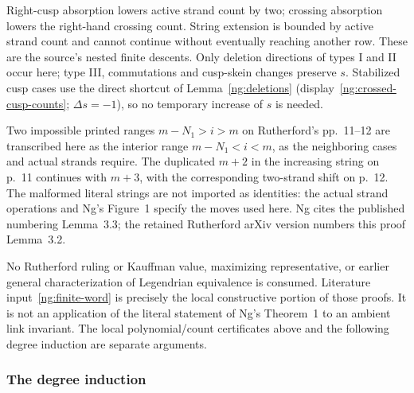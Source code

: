Right-cusp absorption lowers active strand count by two; crossing
absorption lowers the right-hand crossing count. String extension is
bounded by active strand count and cannot continue without eventually
reaching another row. These are the source's nested finite descents.
Only deletion directions of types I and II occur here; type III,
commutations and cusp-skein changes preserve $s$. Stabilized cusp cases
use the direct shortcut of Lemma~\ref{ng:deletions}
(display~\eqref{ng:crossed-cusp-counts}; $\Delta s=-1$), so no temporary
increase of $s$ is needed.

Two impossible printed ranges $m-N_1>i>m$ on Rutherford's pp.~11--12
are transcribed here as the interior range $m-N_1<i<m$, as the
neighboring cases and actual strands require. The duplicated $m+2$
in the increasing string on p.~11 continues with $m+3$, with the
corresponding two-strand shift on p.~12. The malformed literal strings
are not imported as identities: the actual strand operations and Ng's
Figure~1 specify the moves used here. Ng cites the published numbering
Lemma~3.3; the retained Rutherford arXiv version numbers this proof
Lemma~3.2.

No Rutherford ruling or Kauffman value, maximizing representative, or
earlier general characterization of Legendrian equivalence is consumed.
Literature input~\ref{ng:finite-word} is precisely the local constructive
portion of those proofs. It is not an application of the literal
statement of Ng's Theorem~1 to an ambient link invariant. The local
polynomial/count certificates above and the following degree induction
are separate arguments.

\subsubsection{The degree induction}
\label{ng:induction-section}

